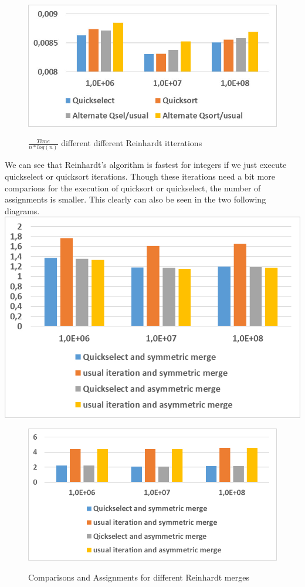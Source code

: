 \documentclass[11pt,pdftex,a4paper, twocolumn]{article}
\begin{document}
\begin{figure}[H]
\includegraphics[width=\linewidth]{Diagramm-Bilder/diff-iterations-time.JPG} \\
\caption{ $ \frac{Time}{n*log(n)} $ different different Reinhardt itterations } \label{fig:diff-iterations-time}
\end{figure}
We can see that Reinhardt’s algorithm is fastest for integers if we just execute quickselect or quicksort iterations. Though these iterations need a bit more comparions for the execution of quicksort or quickselect, the number of assignments is smaller. This clearly can also be seen in the two following diagrams. \\
\includegraphics[width=\linewidth]{Diagramm-Bilder/diff-iterationsAndMerges-comparisons.JPG} \\
\begin{figure}[H]
\includegraphics[width=\linewidth]{Diagramm-Bilder/diff-iterationsAndMerges-assignments.JPG} \\
\caption{Comparisons and Assignments for different Reinhardt merges} \label{fig:diff-iterationsAndMerges-assignAndComp}
\end{figure}
\end{document}
